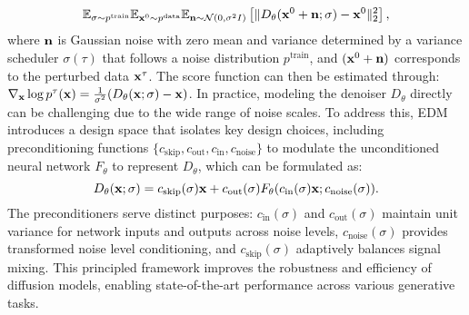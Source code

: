 \begin{equation}
\mathbb{E}_{\sigma\sim p^{\text{train}}}\mathbb{E}_{{{\mathbf{x}}^0}\sim p^{\text{data}}}\mathbb{E}_{{\mathbf{n}}\sim\mathcal{N}(0,\sigma^2I)}
\left[\|D_\theta({\mathbf{x}}^0 + {\mathbf{n}};\sigma) - {\mathbf{x}}^0\|_2^2\right],
\label{eq:d_loss}
\end{equation}
where ${\mathbf{n}}$ is Gaussian noise with zero mean and variance determined by a variance scheduler $\sigma(\tau)$ that follows a noise distribution $p^\text{train}$, and $({\mathbf{x}}^0+{\mathbf{n}})$ corresponds to the perturbed data ${\mathbf{x}}^\tau$.
The score function can then be estimated through: $\nabla_{{\mathbf{x}}} \log p^{\tau}({\mathbf{x}}) = \frac{1}{\sigma^2}(D_\theta({\mathbf{x}};\sigma) - {\mathbf{x}})$.
In practice, modeling the denoiser $D_\theta$ directly can be challenging due to the wide range of noise scales.
To address this, EDM \cite{karras2022elucidating} introduces a design space that isolates key design choices, including preconditioning functions $\{c_{\text{skip}},c_{\text{out}},c_{\text{in}},c_{\text{noise}}\}$ to modulate the unconditioned neural network $F_\theta$ to represent $D_\theta$, which can be formulated as:
\begin{equation}
D_\theta({\mathbf{x}} ; \sigma) = c_{\text{skip}}(\sigma){\mathbf{x}} + c_{\text{out}}(\sigma)F_\theta(c_{\text{in}}(\sigma) {\mathbf{x}} ; c_{\text{noise}}(\sigma)).
\end{equation}
The preconditioners serve distinct purposes: $c_{\text{in}}(\sigma)$ and $c_{\text{out}}(\sigma)$ maintain unit variance for network inputs and outputs across noise levels, $c_{\text{noise}}(\sigma)$ provides transformed noise level conditioning, and $c_{\text{skip}}(\sigma)$ adaptively balances signal mixing.
This principled framework improves the robustness and efficiency of diffusion models, enabling state-of-the-art performance across various generative tasks.


